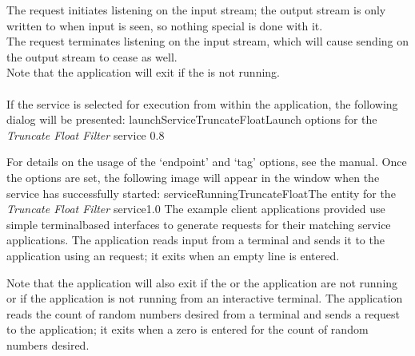 The  request initiates listening
on the input stream; the output stream is only written to when input is seen, so nothing
special is done with it.\\

The  request terminates listening
on the input stream, which will cause sending on the output stream to cease as well.\\

Note that the application will exit if the  is not
running.\\

\insertAppParameters
{}
\insertFilterServiceComment\\

\insertStandardServiceCommands
\condPage{}
If the service is selected for execution from within the \emph{\MMMU} application, the
following dialog will be presented:
%
{launchServiceTruncateFloat}{Launch options for the \emph{Truncate Float Filter} service}%
{0.8}

For details on the usage of the `endpoint' and `tag' options, see the \emph{\MMMU} manual.
Once the options are set, the following image will appear in the \emph{\MMMU} window when
the service has successfully started:
%
{serviceRunningTruncateFloat}{The \emph{\MMMU} entity for the \emph{Truncate Float Filter}
service}{1.0}
\secondaryEnd
\condPage
{}
The example client applications provided use simple terminal\longDash{}based interfaces to
generate requests for their matching service applications.
The  application reads input from a terminal and
sends it to the  application using an
 request; it exits when an empty line is
entered.\\

\insertShortClientParameters{}

Note that the application will also exit if the  or the
 application are not running or if the application
is not running from an interactive terminal.
The  application reads the count of
random numbers desired from a terminal and sends a
 request to the
 application; it exits when a zero is
entered for the count of random numbers desired.

